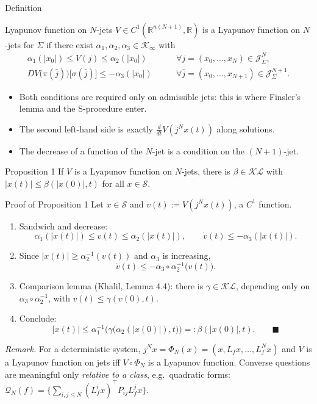\documentclass[10pt,aspectratio=169]{beamer}
\newcommand{\R}{\mathbb{R}}
\newcommand{\Jet}{\mathcal{J}}
\newcommand{\tr}{^{\top}}
\newcommand{\Sol}{\mathcal{S}}
\begin{document}
\begin{frame}{Definition}
\begin{block}{Lyapunov function on $N$-jets}
$V\in C^1(\R^{n(N+1)},\R)$ is a Lyapunov function on $N$-jets for $\Sigma$ if there exist $\alpha_1,\alpha_2,\alpha_3\in\mathcal K_\infty$ with
\begin{align*}
\alpha_1(|x_0|)\le V(j)\le\alpha_2(|x_0|)\qquad&\forall j=(x_0,\dots,x_N)\in\Jet^N_\Sigma,\\
DV\big(\pi(\bar j)\big)\big[\sigma(\bar j)\big]\le-\alpha_3(|x_0|)\qquad&\forall \bar j=(x_0,\dots,x_{N+1})\in\Jet^{N+1}_\Sigma.
\end{align*}
\end{block}
\begin{itemize}
\item Both conditions are required \alert{only on admissible jets}: this is where Finsler's lemma and the S-procedure enter.
\item The second left-hand side is exactly $\frac{d}{dt}V(j^Nx(t))$ along solutions.
\item The decrease of a function of the $N$-jet is a condition on the $(N+1)$-jet.
\end{itemize}
\begin{block}{Proposition 1}
If $V$ is a Lyapunov function on $N$-jets, there is $\beta\in\mathcal{KL}$ with $|x(t)|\le\beta(|x(0)|,t)$ for all $x\in\Sol$.
\end{block}
\end{frame}

\begin{frame}{Proof of Proposition 1}
Let $x\in\Sol$ and $v(t):=V(j^Nx(t))$, a $C^1$ function.
\begin{enumerate}
\item Sandwich and decrease:
\[
\alpha_1(|x(t)|)\le v(t)\le\alpha_2(|x(t)|),\qquad \dot v(t)\le-\alpha_3(|x(t)|).
\]
\item Since $|x(t)|\ge\alpha_2^{-1}(v(t))$ and $\alpha_3$ is increasing,
\[
\dot v(t)\le-\alpha_3\circ\alpha_2^{-1}\big(v(t)\big).
\]
\item Comparison lemma (Khalil, Lemma 4.4): there is $\gamma\in\mathcal{KL}$, depending only on $\alpha_3\circ\alpha_2^{-1}$, with $v(t)\le\gamma(v(0),t)$.
\item Conclude:
\[
|x(t)|\le\alpha_1^{-1}\Big(\gamma\big(\alpha_2(|x(0)|),t\big)\Big)=:\beta(|x(0)|,t).\qquad\blacksquare
\]
\end{enumerate}
\medskip
\emph{Remark.} For a deterministic system, $j^Nx=\Phi_N(x)=(x,L_fx,\dots,L_f^Nx)$ and $V$ is a Lyapunov function on jets iff $V\circ\Phi_N$ is a Lyapunov function. Converse questions are meaningful only \emph{relative to a class}, e.g.\ quadratic forms:
$\mathcal Q_N(f)=\{\sum_{i,j\le N}(L_f^ix)\tr P_{ij}L_f^jx\}$.
\end{frame}
\end{document}
